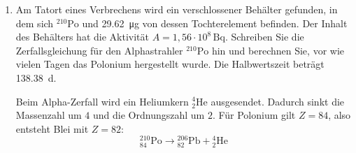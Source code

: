 \documentclass[11pt,a4paper]{scrartcl}
\begin{document}
\begin{enumerate}[label=(\alph*)]
            \begin{answerbox}
                Unter der Annahme gleicher Anfangshäufigkeit wäre die Materie des Sonnensystems etwa
                \[
                    \boxed{t\approx 5{,}94\cdot 10^9\,\mathrm{Jahre}}
                \]
                alt.

                Interpretation: Dieses Ergebnis ist größer als das übliche Alter des Sonnensystems.
                Die Annahme, dass ${}^{238}\mathrm{U}$ und ${}^{235}\mathrm{U}$ bei der Entstehung exakt gleich häufig vorhanden waren,
                ist also eine starke Modellannahme. Das Ergebnis zeigt vor allem, dass ${}^{235}\mathrm{U}$ wegen seiner kürzeren Halbwertszeit deutlich schneller zerfällt als ${}^{238}\mathrm{U}$.
            \end{answerbox}

        \item
            Am Tatort eines Verbrechens wird ein verschlossener Behälter gefunden,
            in dem sich ${}^{210}\mathrm{Po}$ und \SI{29.62}{\micro\gram} von dessen Tochterelement befinden.
            Der Inhalt des Behälters hat die Aktivität $A=1{,}56\cdot 10^8\,\mathrm{Bq}$.
            Schreiben Sie die Zerfallsgleichung für den Alphastrahler ${}^{210}\mathrm{Po}$ hin und berechnen Sie,
            vor wie vielen Tagen das Polonium hergestellt wurde. Die Halbwertszeit beträgt \SI{138.38}{d}.

            \begin{calculationbox}
                Beim Alpha-Zerfall wird ein Heliumkern ${}^{4}_{2}\mathrm{He}$ ausgesendet.
                Dadurch sinkt die Massenzahl um $4$ und die Ordnungszahl um $2$.
                Für Polonium gilt $Z=84$, also entsteht Blei mit $Z=82$:
                \[
                    \boxed{
                    {}^{210}_{84}\mathrm{Po}\longrightarrow {}^{206}_{82}\mathrm{Pb}+{}^{4}_{2}\mathrm{He}
                    }
                \]
            \end{calculationbox}


\end{enumerate}
\end{document}
